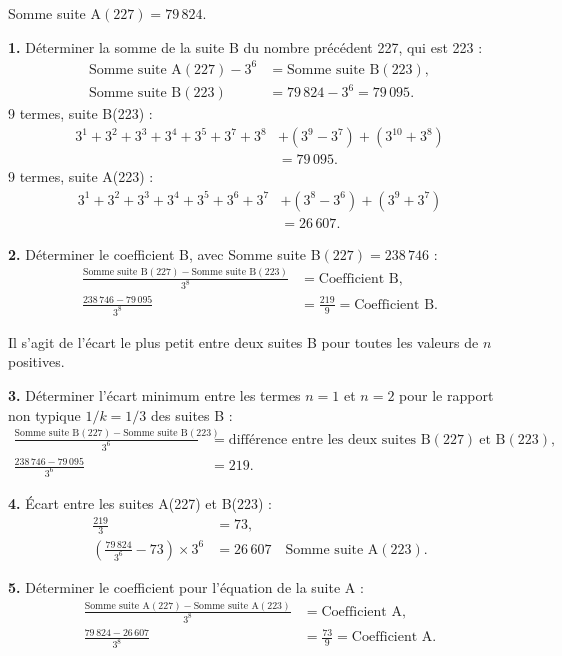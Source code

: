 \documentclass[11pt,a4paper]{article}
\begin{document}
Somme suite A$(227) = 79\,824$.

\textbf{1.} Déterminer la somme de la suite B du nombre précédent 227, qui est 223 :
\begin{align*}
\text{Somme suite A}(227)-3^{6}
  &= \text{Somme suite B}(223),\\
\text{Somme suite B}(223)
  &= 79\,824-3^{6}=79\,095.
\end{align*}
9 termes, suite B(223) :
\begin{align*}
3^{1}+3^{2}+3^{3}+3^{4}+3^{5}+3^{7}+3^{8}
&+(3^{9}-3^{7})+(3^{10}+3^{8})\\
&=79\,095.
\end{align*}
9 termes, suite A(223) :
\begin{align*}
3^{1}+3^{2}+3^{3}+3^{4}+3^{5}+3^{6}+3^{7}
&+(3^{8}-3^{6})+(3^{9}+3^{7})\\
&=26\,607.
\end{align*}

\textbf{2.} Déterminer le coefficient B, avec Somme suite B$(227) = 238\,746$ :
\begin{align*}
\frac{\text{Somme suite B}(227) - \text{Somme suite B}(223)}{3^{8}}
&= \text{Coefficient B},\\
\frac{238\,746 - 79\,095}{3^{8}} &= \frac{219}{9} = \text{Coefficient B}.
\end{align*}
\begin{boitenote}
Il s'agit de l'écart le plus petit entre deux suites B pour toutes les valeurs
de $n$ positives.
\end{boitenote}

\textbf{3.} Déterminer l'écart minimum entre les termes $n=1$ et $n=2$ pour le
rapport non typique $1/k = 1/3$ des suites B :
\begin{align*}
\frac{\text{Somme suite B}(227) - \text{Somme suite B}(223)}{3^{6}}
&= \text{différence entre les deux suites B}(227)\ \text{et B}(223),\\
\frac{238\,746 - 79\,095}{3^{6}} &= 219.
\end{align*}

\textbf{4.} Écart entre les suites A(227) et B(223) :
\begin{align*}
\frac{219}{3} &= 73,\\
\left(\frac{79\,824}{3^{6}} - 73\right) \times 3^{6}
&= 26\,607 \quad \text{Somme suite A}(223).
\end{align*}

\textbf{5.} Déterminer le coefficient pour l'équation de la suite A :
\begin{align*}
\frac{\text{Somme suite A}(227) - \text{Somme suite A}(223)}{3^{8}}
&= \text{Coefficient A},\\
\frac{79\,824 - 26\,607}{3^{8}} &= \frac{73}{9} = \text{Coefficient A}.
\end{align*}
\end{document}
